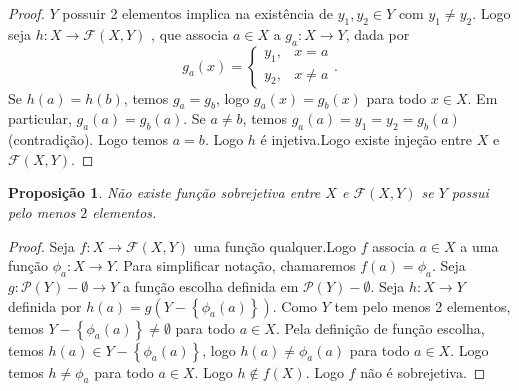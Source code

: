 \documentclass{article}
\theoremstyle{plain}
\newtheorem{prop}{Proposição}[section]
\theoremstyle{definition}
\theoremstyle{remark}
\begin{document}
\begin{proof}
	$Y$ possuir 2 elementos implica na existência de $y_1,y_2\in Y$ com $y_1\neq y_2$. Logo seja $h:X\to \mathcal{F}(X,Y)$ , que associa $a\in X$ a $g_a:X\to Y$, dada por $$g_a(x) = \begin{cases} y_1 , & x = a\\ y_2, & x\neq a\end{cases}. $$
		Se $h(a) = h(b)$, temos $g_a = g_b$, logo $g_a(x) = g_b(x)$ para todo $x\in X$. Em particular, $g_a(a) = g_b(a)$. Se $a\neq b$, temos $g_a(a) = y_1 = y_2 = g_b(a)$ (contradição).  Logo temos $ a= b$.  Logo $h$ é injetiva.Logo existe injeção entre $X$ e $\mathcal{F}(X,Y)$.
\end{proof}
\begin{prop}
	Não existe função sobrejetiva entre $X$ e $\mathcal{F}(X,Y)$ se $Y$ possui pelo menos $2$ elementos.
\end{prop}
\begin{proof}
	Seja $f: X \to \mathcal{F}(X,Y)$ uma função qualquer.Logo  $f$ associa $a\in X$ a uma função $\phi_a : X\to Y$. Para simplificar notação, chamaremos $f(a) = \phi_a$. Seja $g: \mathcal{P}(Y) - \emptyset \to Y$ a função escolha definida em $\mathcal{P}(Y) - \emptyset$. Seja $h: X\to Y$ definida por $h(a) = g(Y -  \left\{ \phi_a(a)\right\})$. Como $Y$ tem pelo menos 2 elementos, temos $Y - \left\{ \phi_a(a)\right\} \neq \emptyset$ para todo $a\in X$.  Pela definição de função escolha, temos $h(a) \in Y - \left\{ \phi_a(a)\right\}$, logo $h(a) \neq \phi_a(a)$ para todo $a\in X$. Logo temos $h\neq \phi_a$ para todo $a\in X$. Logo $h\not\in f(X)$. Logo $f$ não é sobrejetiva.
\end{proof}
\end{document}
